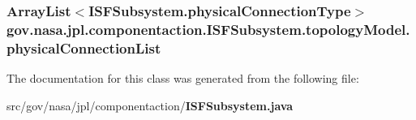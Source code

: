 \subsubsection[{physical\+Connection\+List}]{\setlength{\rightskip}{0pt plus 5cm}Array\+List$<$I\+S\+F\+Subsystem.\+physical\+Connection\+Type$>$ gov.\+nasa.\+jpl.\+componentaction.\+I\+S\+F\+Subsystem.\+topology\+Model.\+physical\+Connection\+List\hspace{0.3cm}{\ttfamily [package]}}\label{classgov_1_1nasa_1_1jpl_1_1componentaction_1_1_i_s_f_subsystem_1_1topology_model_a7ec889f1cbc5d20b47e6d047112eaa02}


The documentation for this class was generated from the following file\+:\begin{DoxyCompactItemize}
\item 
src/gov/nasa/jpl/componentaction/{\bf I\+S\+F\+Subsystem.\+java}\end{DoxyCompactItemize}
